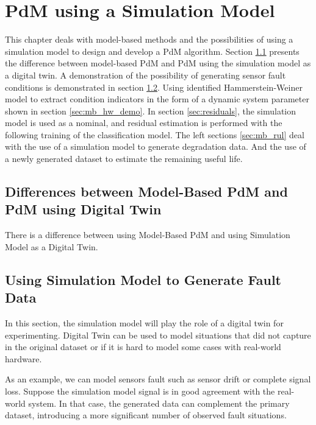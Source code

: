 %


\chapter{PdM using a Simulation Model}\label{ch:mb}
This chapter deals with model-based methods and the possibilities of using
a simulation model to design and develop a PdM algorithm.  Section
\ref{sec:diffs_mb_dt} presents the difference between model-based PdM and
PdM using the simulation model as a digital twin.  A demonstration of the
possibility of generating sensor fault conditions is demonstrated in
section \ref{sec:sensor_fault_generation}.  Using identified
Hammerstein-Weiner model to extract condition indicators in the form of a
dynamic system parameter shown in section \ref{sec:mb_hw_demo}.  In section
\ref{sec:residuals}, the simulation model is used as a nominal, and
residual estimation is performed with the following training of the
classification model.  The left sections \ref{sec:mb_rul} deal with the use
of a simulation model to generate degradation data. And the use of a newly
generated dataset to estimate the remaining useful life.


\section{Differences between Model-Based PdM and PdM using Digital Twin}\label{sec:diffs_mb_dt}
There is a difference between using Model-Based PdM and using Simulation
Model as a Digital Twin.

\section{Using Simulation Model to Generate Fault Data}\label{sec:sensor_fault_generation}
In this section, the simulation model will play the role of a digital twin
for experimenting.  Digital Twin can be used to model situations that did
not capture in the original dataset or if it is hard to model some cases
with real-world hardware.

As an example, we can model sensors fault such as
sensor drift or complete signal loss. Suppose the simulation model signal
is in good agreement with the real-world system. In that case, the
generated data can complement the primary dataset, introducing a more
significant number of observed fault situations.



